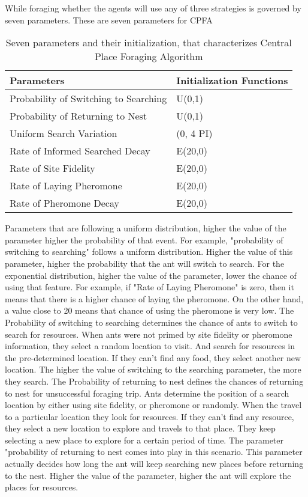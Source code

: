 While foraging whether the agents will use any of three strategies is governed by seven parameters. These are seven parameters for CPFA
\begin{table}[h]
	\begin{tabular}{ |p{}|p{}| } 
		\hline
		\textbf{Parameters} & \textbf{Initialization Functions} \\
		\hline 
		Probability of Switching to Searching & U(0,1)\\ 
		\hline
		Probability of Returning to Nest & U(0,1)\\ 
		\hline
		Uniform Search Variation & (0, 4 PI)\\
		\hline
		Rate of Informed Searched Decay & E(20,0)\\
		\hline
		Rate of Site Fidelity & E(20,0)\\
		\hline
		Rate of Laying Pheromone & E(20,0)\\
		\hline
		Rate of Pheromone Decay & E(20,0)\\
		\hline
	\end{tabular}
	\caption{Seven parameters and their initialization, that characterizes Central Place Foraging Algorithm}
\end{table}
Parameters that are following a uniform distribution, higher the value of the parameter higher the probability of that event. For example, "probability of switching to searching" follows a uniform distribution. Higher the value of this parameter, higher the probability that the ant will switch to search. For the exponential distribution, higher the value of the parameter, lower the chance of using that feature. For example, if "Rate of Laying Pheromone" is zero, then it means that there is a higher chance of laying the pheromone. On the other hand,  a value close to 20 means that chance of using the pheromone is very low. 
The Probability of switching to searching determines the chance of ants to switch to search for resources. When ants were not primed by site fidelity or pheromone information, they select a random location to visit. And search for resources in the pre-determined location. If they can’t find any food, they select another new location. The higher the value of switching to the searching parameter, the more they search. 
The Probability of returning to nest defines the chances of returning to nest for unsuccessful foraging trip. Ants determine the position of a search location by either using site fidelity, or pheromone or randomly. When the travel to a particular location they look for resources. If they can't find any resource, they select a new location to explore and travels to that place. They keep selecting a new place to explore for a certain period of time. The parameter "probability of returning to nest comes into play in this scenario. This parameter actually decides how long the ant will keep searching new places before returning to the nest. Higher the value of the parameter, higher the ant will explore the places for resources. 
